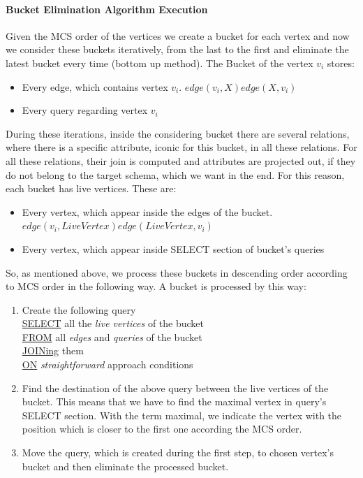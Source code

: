 \paragraph{Bucket Elimination Algorithm Execution}
Given the MCS order of the vertices we create a bucket for each vertex and now we consider these buckets iteratively, from the last to the first and eliminate the latest bucket every time (bottom up method). The Bucket of the vertex $v_i$ stores:
\begin{itemize}
\item Every edge, which contains vertex $v_i$. $edge(v_i,X) edge(X,v_i)$
\item Every query regarding vertex $v_i$
\end{itemize}
\noindent During these iterations, inside the considering bucket there are several relations, where there is a specific attribute, iconic for this bucket, in all these relations. For all these relations, their join is computed and attributes are projected out, if they do not belong to the target schema, which we want in the end. For this reason, each bucket has live vertices. These are:
\begin{itemize}
\item Every vertex, which appear inside the edges of the bucket. $edge(v_i,LiveVertex) edge(LiveVertex,v_i )$
\item Every vertex, which appear inside SELECT section of bucket’s queries
\end{itemize}
So, as mentioned above, we process these buckets in descending order according to MCS order in the following way. A bucket is processed by this way:

\begin{enumerate}
\item Create the following query \\
\underline{SELECT} all the \emph{live vertices} of the bucket \\
\underline{FROM} all \emph{edges} and \emph{queries} of the bucket\\
\underline{JOINing} them \\
\underline{ON} \emph{straightforward} approach conditions
\item Find the destination of the above query between the live vertices of the bucket. This means that we have to find the maximal vertex in query’s  SELECT section. With the term maximal, we indicate the vertex with the position which is closer to the first one according the MCS order. 
\item Move the query, which is created during the first step, to chosen vertex’s bucket and then eliminate the processed bucket.
\end{enumerate}

